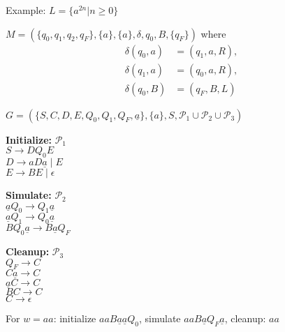 \documentclass[handout]{beamer}
\begin{document}
\begin{frame}{Example: $L=\{a^{2n}| n\geq 0\}$}

    $M=(\{q_0,q_1,q_2,q_F\},\{a\},\{a\},\delta,q_0,B,\{q_F\})$ where 
    \begin{align*}
        \delta(q_0,a)&=( q_1,a,R),\\
        \delta(q_1,a)&=(q_0,a,R), \\
        \delta(q_0,B)&=(q_F,B,L)
    \end{align*}
        
    $G=(\{S,C,D,E,Q_0,Q_1,Q_F,\underline{a}\},\{a\},S,\mathcal P_1\cup\mathcal P_2\cup\mathcal P_3)$ \\

    \begin{multicols}{3}
        
        \textbf{Initialize:} $\mathcal P_1$\\
        $S\rightarrow DQ_0E$\\
        $D\rightarrow aD\underline{a}\mid E$\\        
        $E\rightarrow BE\mid\epsilon$

        \newcolumn

        \textbf{Simulate:} $\mathcal P_2$\\
        $\underline{a}Q_0\rightarrow Q_1\underline{a}$\\
        $\underline{a}Q_1\rightarrow Q_0\underline{a}$\\
        $BQ_0\underline{a}\rightarrow B\underline{a}Q_F$
        
        \newcolumn

        \textbf{Cleanup:} $\mathcal P_3$\\
        $Q_F\rightarrow C$\\
        $C\underline{a}\rightarrow C$\\
        $\underline{a}C\rightarrow C$\\
        $BC\rightarrow C$\\
        $C\rightarrow\epsilon$
        
    \end{multicols}
    
    \vspace{-12pt}

    For $w=aa$: initialize \alert{$aaB\underline{a}\underline{a}Q_0$},
     simulate \alert{$aaB\underline{a}Q_F\underline{a}$}, cleanup: \alert{$aa$}

\end{frame}
\end{document}
